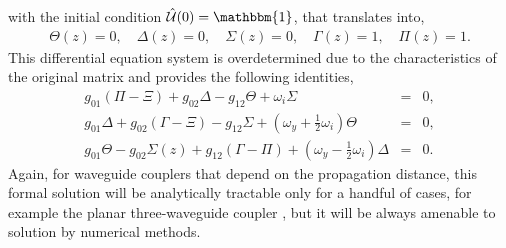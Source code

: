 \documentclass[9pt,twocolumn,twoside]{osajnl}
\begin{document}
with the initial condition $\hat{\mathcal{U}}(0) = \mathbbm{1}$, that translates into,
\begin{eqnarray}
\Theta(z)= 0 , \quad \Delta(z) =  0, \quad \Sigma(z)= 0, \quad
\Gamma(z)= 1, \quad \Pi(z)= 1. \label{eq:initsb}
\end{eqnarray}
This differential equation system is overdetermined due to the characteristics of the original matrix and provides the following identities,
\begin{eqnarray}
g_{01} \left( \Pi - \Xi \right) + g_{02} \Delta - g_{12} \Theta + \omega_{i} \Sigma &=& 0, \\
g_{01} \Delta + g_{02} \left( \Gamma - \Xi \right) - g_{12} \Sigma + \left(  \omega_{y} +\frac{1}{2}\omega_{i}   \right) \Theta &=& 0, \\
g_{01} \Theta - g_{02} \Sigma(z) + g_{12} \left( \Gamma - \Pi \right)  + \left(  \omega_{y} - \frac{1}{2}\omega_{i}\right) \Delta &=& 0. 
\end{eqnarray}
Again, for waveguide couplers that depend on the propagation distance, this formal solution will be analytically tractable only for a handful of cases, for example the planar three-waveguide coupler \cite{RodriguezLara2014p013802}, but it will be always amenable to solution by numerical methods. 

\end{document}
